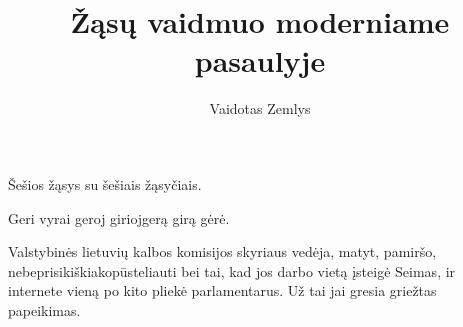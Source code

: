 \documentclass{article}
\begin{document}
\author{Vaidotas Zemlys}
\title{Žąsų vaidmuo moderniame pasaulyje}
\maketitle
\thispagestyle{empty}

Šešios žąsys su šešiais žąsyčiais.

Geri vyrai geroj girioj\newline gerą girą gėrė.

Valstybinės lietuvių kalbos komisijos skyriaus vedėja, matyt, pamiršo, nebeprisikiškiakopūsteliauti bei tai, kad jos darbo vietą įsteigė Seimas, ir internete vieną po kito pliekė parlamentarus. Už tai jai gresia griežtas papeikimas.
\end{document}
